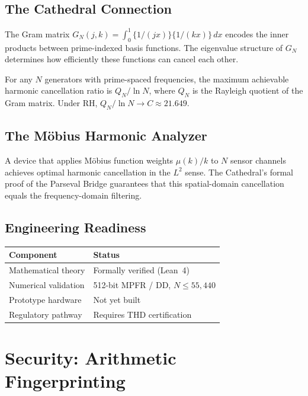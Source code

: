 \documentclass[11pt,a4paper]{article}
\begin{document}
\subsection{The Cathedral Connection}

The Gram matrix $G_N(j,k) = \int_0^1 \{1/(jx)\}\{1/(kx)\}\,dx$
encodes the inner products between prime-indexed basis functions.
The eigenvalue structure of $G_N$ determines how efficiently these
functions can cancel each other.

\begin{theorem}
For any $N$ generators with prime-spaced frequencies, the maximum
achievable harmonic cancellation ratio is $Q_N / \ln N$, where
$Q_N$ is the Rayleigh quotient of the Gram matrix. Under RH,
$Q_N / \ln N \to C \approx 21.649$.
\end{theorem}

\subsection{The M\"obius Harmonic Analyzer}

A device that applies M\"obius function weights $\mu(k)/k$ to
$N$ sensor channels achieves optimal harmonic cancellation in the
$L^2$ sense. The Cathedral's formal proof of the Parseval Bridge
guarantees that this spatial-domain cancellation equals the
frequency-domain filtering.

\subsection{Engineering Readiness}

\begin{center}
\begin{tabular}{@{}ll@{}}
\toprule
\textbf{Component} & \textbf{Status} \\
\midrule
Mathematical theory & Formally verified (Lean~4) \\
Numerical validation & 512-bit MPFR / DD, $N \leq 55{,}440$ \\
Prototype hardware & Not yet built \\
Regulatory pathway & Requires THD certification \\
\bottomrule
\end{tabular}
\end{center}

\section{Security: Arithmetic Fingerprinting}
\end{document}
